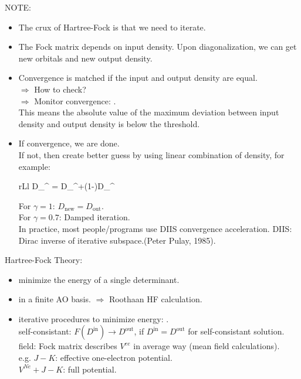 \documentclass[a4paper, 12pt]{article}
\begin{document}
\begin{enumerate}
NOTE:
\begin{itemize}
	\item The crux of Hartree-Fock is that we need to iterate.
	\item The Fock matrix depends on input density. Upon diagonalization, we can get new orbitals and new output density.
	\item Convergence is matched if the input and output density are equal.\\
	$\Longrightarrow$ How to check? \\
	$\Longrightarrow$ Monitor convergence: . \\
	This means the absolute value of the maximum deviation between input density and output density is below the threshold.  
	\item If convergence, we are done.\\
	If not, then create better guess by using linear combination of density, for example:
		\begin{IEEEeqnarray}{rLl}	
	D_{}^{\sigma} = \gamma D_{}^{\sigma}+(1-\gamma )D_{}^{\sigma} 
		\end{IEEEeqnarray}
	For $\gamma=1$: $D_{\text{new}}=D_{\text{out}}$.\\
	For $\gamma=0.7$: Damped iteration. \\
	In practice, most people/programs use DIIS convergence acceleration. DIIS: Dirac inverse of iterative subspace.(Peter Pulay, 1985).
	
\end{itemize}

\end{enumerate}
\begin{summary}{}{}
 Hartree-Fock Theory: 
 \begin{itemize}
 	\item minimize the energy of a single determinant.
 	\item in a finite AO basis. 	$\Rightarrow$ Roothaan HF calculation.
 	\item iterative procedures to minimize energy: .\\
 	self-consistant: $F(D^{\text{in}})\rightarrow D^{\text{out}}$, if $D^{\text{in}}=D^{\text{out}}$ for self-consistant solution.\\
 	field: Fock matrix describes $V^{ee}$ in average way (mean field calculations). \\
 	e.g. $J-K$: effective one-electron potential.\\
 	\tab $V^{Ne}+J-K$: full potential. 
 \end{itemize}  
\end{summary}
\end{document}
